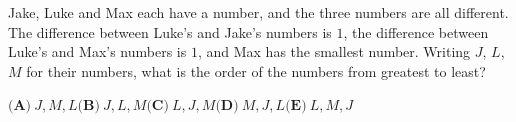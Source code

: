 Jake, Luke and Max each have a number, and the three numbers are all different. The difference between Luke's and Jake's numbers is $1$, the difference between Luke's and Max's numbers is $1$, and Max has the smallest number. Writing $J$, $L$, $M$ for their numbers, what is the order of the numbers from greatest to least?

$\textbf{(A)}\ J,M,L$\qquad$\textbf{(B)}\ J,L,M$\qquad$\textbf{(C)}\ L,J,M$\qquad$\textbf{(D)}\ M,J,L$\qquad$\textbf{(E)}\ L,M,J$
